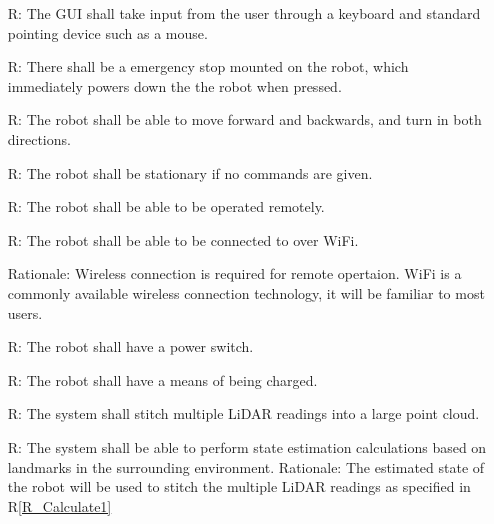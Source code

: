 \documentclass[12pt]{article}
\newcounter{reqnum} %
\newcommand{\rref}[1]{R\ref{#1}}
\begin{document}
\noindent \begin{itemize}

\item[R\refstepcounter{reqnum}\thereqnum \label{R_Inputs1}:] The GUI shall take input from the user through a keyboard and standard pointing device such as a mouse.
\item[R\refstepcounter{reqnum}\thereqnum \label{R_Inputs2}:] There shall be a emergency stop mounted on the robot, which immediately powers down the the robot when pressed.
\item[R\refstepcounter{reqnum}\thereqnum \label{R_Inputs3}:] The robot shall be able to move forward and backwards, and turn in both directions.
\item[R\refstepcounter{reqnum}\thereqnum \label{R_Inputs4}:] The robot shall be stationary if no commands are given.
\item[R\refstepcounter{reqnum}\thereqnum \label{R_Inputs5}:] The robot shall be able to be operated remotely.
\item[R\refstepcounter{reqnum}\thereqnum \label{R_Inputs6}:] The robot shall be able to be connected to over WiFi.
\item[\newline Rationale: Wireless connection is required for remote opertaion. WiFi is a commonly available wireless connection technology, it will be familiar to most users.] 
\item[R\refstepcounter{reqnum}\thereqnum \label{R_Inputs7}:] The robot shall have a power switch.
\item[R\refstepcounter{reqnum}\thereqnum \label{R_Inputs8}:] The robot shall have a means of being charged.

\item[R\refstepcounter{reqnum}\thereqnum \label{R_Calculate1}:] The system shall stitch multiple LiDAR readings into a large point cloud.
\item[R\refstepcounter{reqnum}\thereqnum \label{R_Calculate2}:] The system shall be able to perform state estimation calculations based on landmarks in the surrounding environment.
\newline Rationale: The estimated state of the robot will be used to stitch the multiple LiDAR readings as specified in \rref{R_Calculate1} 


\end{itemize}
\end{document}
